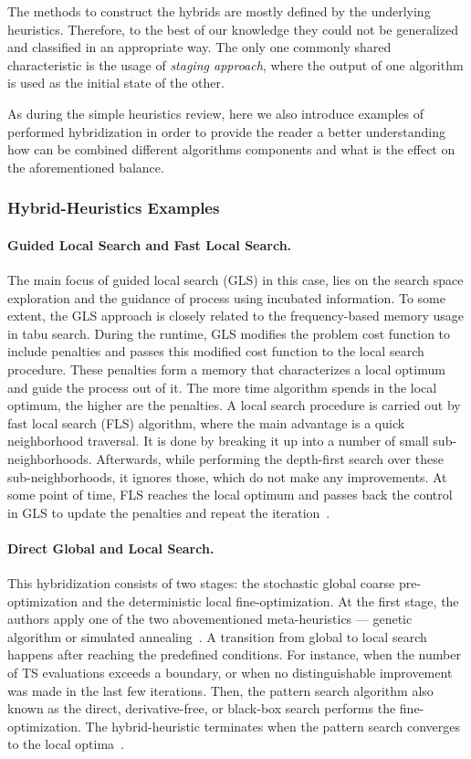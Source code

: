 The methods to construct the hybrids are mostly defined by the underlying heuristics. Therefore, to the best of our knowledge they could not be generalized and classified in an appropriate way. The only one commonly shared characteristic is the usage of \textit{staging approach}, where the output of one algorithm is used as the initial state of the other. 

As during the simple heuristics review, here we also introduce examples of performed hybridization in order to provide the reader a better understanding how can be combined different algorithms components and what is the effect on the aforementioned balance.

\subsubsection{Hybrid-Heuristics Examples}
\paragraph{Guided Local Search and Fast Local Search.}
The main focus of guided local search (GLS) in this case, lies on the search space exploration and the guidance of process using incubated information. To some extent, the GLS approach is closely related to the frequency-based memory usage in tabu search. During the runtime, GLS modifies the problem cost function to include penalties and passes this modified cost function to the local search procedure. These penalties form a memory that characterizes a local optimum and guide the process out of it. The more time algorithm spends in the local optimum, the higher are the penalties. A local search procedure is carried out by fast local search (FLS) algorithm, where the main advantage is a quick neighborhood traversal. It is done by breaking it up into a number of small sub-neighborhoods. Afterwards, while performing the depth-first search over these sub-neighborhoods, it ignores those, which do not make any improvements. At some point of time, FLS reaches the local optimum and passes back the control in GLS to update the penalties and repeat the iteration~\cite{tsang1997fast}.

\paragraph{Direct Global and Local Search.}
This hybridization consists of two stages: the stochastic global coarse pre-optimization and the deterministic local fine-optimization. At the first stage, the authors apply one of the two abovementioned meta-heuristics --- genetic algorithm or simulated annealing~\cite{hooke1961direct}. A transition from global to local search happens after reaching the predefined conditions. For instance, when the number of TS evaluations exceeds a boundary, or when no distinguishable improvement was made in the last few iterations. Then, the pattern search algorithm also known as the direct, derivative-free, or black-box search performs the fine-optimization. The hybrid-heuristic terminates when the pattern search converges to the local optima~\cite{syrjakow1999efficient}.

